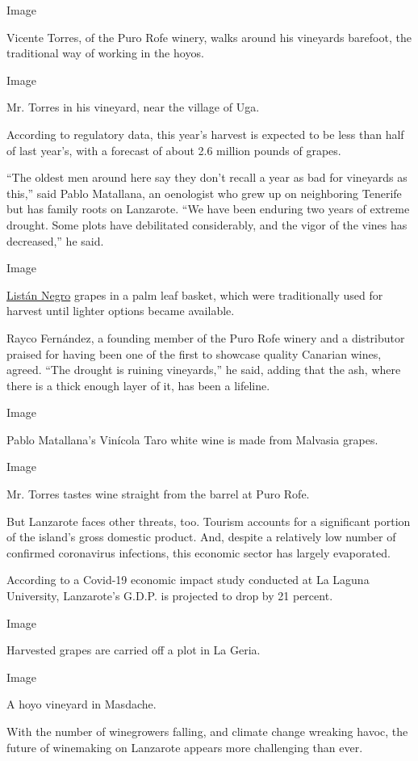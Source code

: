 Image

Vicente Torres, of the Puro Rofe winery, walks around his vineyards
barefoot, the traditional way of working in the hoyos.

Image

Mr. Torres in his vineyard, near the village of Uga.

According to regulatory data, this year's harvest is expected to be less
than half of last year's, with a forecast of about 2.6 million pounds of
grapes.

``The oldest men around here say they don't recall a year as bad for
vineyards as this,'' said Pablo Matallana, an oenologist who grew up on
neighboring Tenerife but has family roots on Lanzarote. ``We have been
enduring two years of extreme drought. Some plots have debilitated
considerably, and the vigor of the vines has decreased,'' he said.

Image

\href{https://en.wikipedia.org/wiki/Listán_negro}{Listán Negro} grapes
in a palm leaf basket, which were traditionally used for harvest until
lighter options became available.

Rayco Fernández, a founding member of the Puro Rofe winery and a
distributor praised for having been one of the first to showcase quality
Canarian wines, agreed. ``The drought is ruining vineyards,'' he said,
adding that the ash, where there is a thick enough layer of it, has been
a lifeline.

Image

Pablo Matallana's Vinícola Taro white wine is made from Malvasia grapes.

Image

Mr. Torres tastes wine straight from the barrel at Puro Rofe.

But Lanzarote faces other threats, too. Tourism accounts for a
significant portion of the island's gross domestic product. And, despite
a relatively low number of confirmed coronavirus infections, this
economic sector has largely evaporated.

According to a Covid-19 economic impact study conducted at La Laguna
University, Lanzarote's G.D.P. is projected to drop by 21 percent.

Image

Harvested grapes are carried off a plot in La Geria.

Image

A hoyo vineyard in Masdache.

With the number of winegrowers falling, and climate change wreaking
havoc, the future of winemaking on Lanzarote appears more challenging
than ever.

